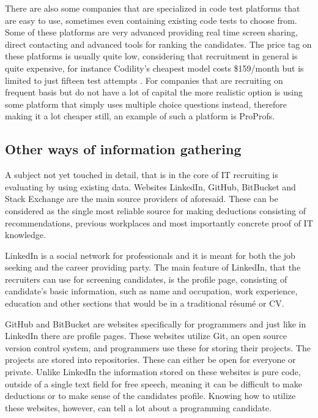 \documentclass[11pt,a4paper,oneside,article]{memoir}
\begin{document}
There are also some companies that are specialized in code test platforms that are easy to use, sometimes even containing existing code tests to choose from. Some of these platforms are very advanced providing real time screen sharing, direct contacting and advanced tools for ranking the candidates. The price tag on these platforms is usually quite low, considering that recruitment in general is quite expensive, for instance Codility's cheapest model costs \$159/month but is limited to just fifteen test attempts \cite{codility}. For companies that are recruiting on frequent basis but do not have a lot of capital the more realistic option is using some platform that simply uses multiple choice questions instead, therefore making it a lot cheaper still, an example of such a platform is ProProfs\cite{proprofs}.






\subsection{Other ways of information gathering}

A subject not yet touched in detail, that is in the core of IT recruiting is evaluating by using existing data. Websites LinkedIn, GitHub, BitBucket and Stack Exchange are the main source providers of aforesaid. These can be considered as the single most reliable source for making deductions consisting of recommendations, previous workplaces and most importantly concrete proof of IT knowledge.

LinkedIn is a social network for professionals and it is meant for both the job seeking and the career providing party. The main feature of LinkedIn, that the recruiters can use for screening candidates, is the profile page, consisting of candidate's basic information, such as name and occupation, work experience, education and other sections that would be in a traditional résumé or CV.

GitHub and BitBucket are websites specifically for programmers and just like in LinkedIn there are profile pages. These websites utilize Git, an open source version control system, and programmers use these for storing their projects. The projects are stored into repositories. These can either be open for everyone or private. Unlike LinkedIn the information stored on these websites is pure code, outside of a single text field for free speech, meaning it can be difficult to make deductions or to make sense of the candidates profile. Knowing how to utilize these websites, however, can tell a lot about a programming candidate.
\end{document}
